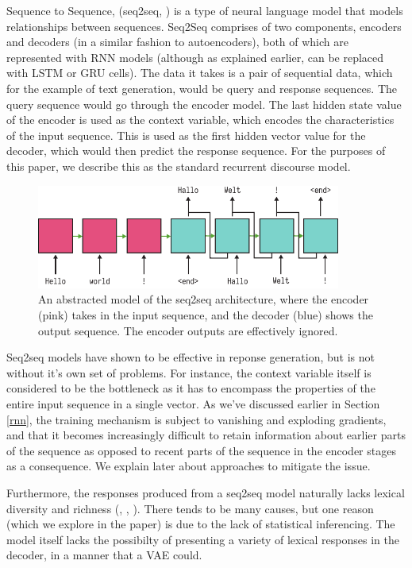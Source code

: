 \documentclass[12pt,twoside]{report}
\begin{document}
Sequence to Sequence, (seq2seq, \cite{sutskever_sequence_2014}) is a type of neural language model that models relationships between sequences.  Seq2Seq comprises of two components, encoders and decoders (in a similar fashion to autoencoders), both of which are represented with RNN models (although as explained earlier, can be replaced with LSTM or GRU cells). The data it takes is a pair of sequential data, which for the example of text generation, would be query and response sequences. The query sequence would go through the encoder model. The last hidden state value of the encoder is used as the context variable, which encodes the characteristics of the input sequence. This is used as the first hidden vector value for the decoder, which would then predict the response sequence. For the purposes of this paper, we describe this as the standard recurrent discourse model.

\begin{figure}[!ht]
		
\centering
\includegraphics[width=100mm]{diagrams/seq2seq.pdf}
\caption{An abstracted model of the seq2seq architecture, where the encoder (pink) takes in the input sequence, and the decoder (blue) shows the output sequence. The encoder outputs are effectively ignored. \label{seq2seq}}
\end{figure}

Seq2seq models have shown to be effective in reponse generation, but is not without it's own set of problems. For instance, the context variable itself is considered to be the bottleneck as it has to encompass the properties of the entire input sequence in a single vector. As we've discussed earlier in Section \ref{rnn}, the training mechanism is subject to vanishing and exploding gradients, and that it becomes increasingly difficult to retain information about earlier parts of the sequence as opposed to recent parts of the sequence in the encoder stages as a consequence. We explain later about approaches to mitigate the issue.

Furthermore, the responses produced from a seq2seq model naturally lacks lexical diversity and richness (\cite{serban_hierarchical_2016}, \cite{zhao_learning_2017}, \cite{jiang_why_2018}). There tends to be many causes, but one reason (which we explore in the paper) is due to the lack of statistical inferencing. The model itself lacks the possibilty of presenting a variety of lexical responses in the decoder, in a manner that a VAE could.
\end{document}
